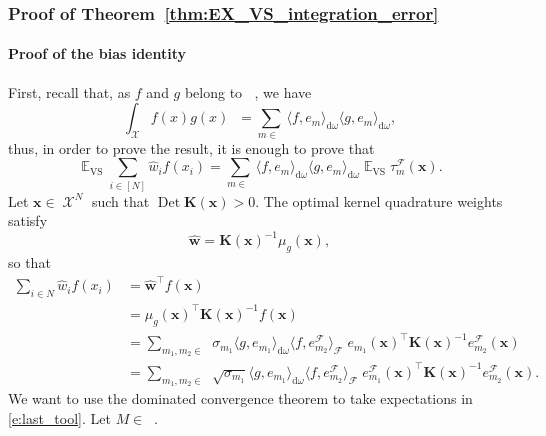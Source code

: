 \documentclass[twoside,11pt]{book}
\DeclareMathOperator{\Det}{Det}
\DeclareMathOperator{\VS}{\mathrm{VS}}
\DeclareMathOperator{\Tran}{\intercal}
\DeclareMathOperator{\EX}{\mathbb{E}}
\DeclareMathOperator{\F}{\mathcal{F}}
\DeclareMathOperator{\X}{\mathcal{X}}
\DeclareMathOperator{\Ltwo}{\mathbb{L}_{2}(\mathrm{d} \omega)}
\DeclareMathOperator{\Mu}{\mathrm{d}\omega(x)}
\DeclareMathOperator{\Ns}{\mathbb{N}^{*}}
\newcommand{\rb}[1]{\textcolor{magenta}{#1}}
\begin{document}
\subsubsection{Proof of Theorem~\ref{thm:EX_VS_integration_error}}\label{app:proof_bias}
\paragraph{Proof of the bias identity}
First, recall that, as $f$ and $g$ belong to $\Ltwo$, we have
\begin{equation}
\int_{\X}f(x)g(x) \Mu = \sum\limits_{m \in \Ns} \langle f,e_{m}\rangle_{\mathrm{d}\omega} \langle g,e_{m}\rangle_{\mathrm{d}\omega},
\end{equation}
thus, in order to prove the result, it is enough to prove that
\begin{equation}\label{eq:EX_VS_optimal_quadrature_formula}
\EX_{\VS} \sum\limits_{i \in [N]} \widehat{w}_{i}f(x_{i}) = \sum\limits_{m \in \Ns} \langle f,e_{m} \rangle_{\mathrm{d}\omega} \langle g,e_{m} \rangle_{\mathrm{d}\omega} \EX_{\VS}\tau_{m}^{\F}(\bm{x}).
\end{equation}
Let $\bm{x} \in \X^{N}$ such that $\Det \bm{K}(\bm{x})>0$. The optimal kernel quadrature weights satisfy
\begin{equation}
\widehat{\bm{w}} = \bm{K}(\bm{x})^{-1}\mu_{g}(\bm{x}),
\end{equation}
so that
\begin{align}
\sum\limits_{i \in N} \widehat{w}_{i}f(x_{i}) & = \widehat{\bm{w}}^{\Tran} f(\bm{x}) \\
& = \mu_{g}(\bm{x})^{\Tran} \bm{K}(\bm{x})^{-1} f(\bm{x})\\
& = \sum_{m_{1},m_{2} \in \Ns} \sigma_{m_{1}} \langle g, e_{m_{1}} \rangle_{\mathrm{d}\omega} \langle f, e_{m_{2}}^{\F} \rangle_{\F} \; e_{m_{1}}(\bm{x})^{\Tran} \bm{K}(\bm{x})^{-1}e_{m_{2}}^{\F}(\bm{x}) \\
& = \sum\limits_{m_{1},m_{2} \in \Ns} \sqrt{\sigma_{m_{1}}} \langle g, e_{m_{1}} \rangle_{\mathrm{d}\omega}  \langle f, e_{m_{2}}^{\F} \rangle_{\F}\;  e_{m_{1}}^{\F}(\bm{x})^{\Tran} \bm{K}(\bm{x})^{-1}e_{m_{2}}^{\F}(\bm{x}).
\label{e:last_tool}
\end{align}
We want to use the dominated convergence theorem to take expectations in \eqref{e:last_tool}.
Let $M \in \Ns$.
\end{document}

